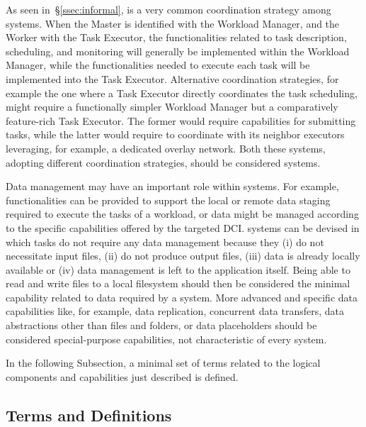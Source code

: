\documentclass{sig-alternate}
\begin{document}
As seen in~\S\ref{ssec:informal}, \MW is a very common coordination
strategy among \pilot systems. When the Master is identified with the
Workload Manager, and the Worker with the Task Executor, the
functionalities related to task description, scheduling, and monitoring
will generally be implemented within the Workload Manager, while the
functionalities needed to execute each task will be implemented into the
Task Executor. Alternative coordination strategies, for example the one
where a Task Executor directly coordinates the task scheduling, might
require a functionally simpler Workload Manager but a comparatively
feature-rich Task Executor. The former would require capabilities for
submitting tasks, while the latter would require to coordinate with its
neighbor executors leveraging, for example, a dedicated overlay network.
Both these systems, adopting different coordination strategies, should
be considered \pilot systems.

Data management may have an important role within \pilot systems. For
example, functionalities can be provided to support the local or remote
data staging required to execute the tasks of a workload, or data might
be managed according to the specific capabilities offered by the
targeted DCI. \pilot systems can be devised in which tasks do not
require any data management because they (i) do not necessitate input
files, (ii) do not produce output files, (iii) data is already locally
available or (iv) data management is left to the application itself.
Being able to read and write files to a local filesystem should then be
considered the minimal capability related to data required by a \pilot
system. More advanced and specific data capabilities like, for example,
data replication, concurrent data transfers, data abstractions other
than files and folders, or data placeholders should be considered
special-purpose capabilities, not characteristic of every \pilot system.

In the following Subsection, a minimal set of terms related to the
logical components and capabilities just described is defined.

\subsection{Terms and Definitions}
\label{subsec:3.2}
\end{document}

